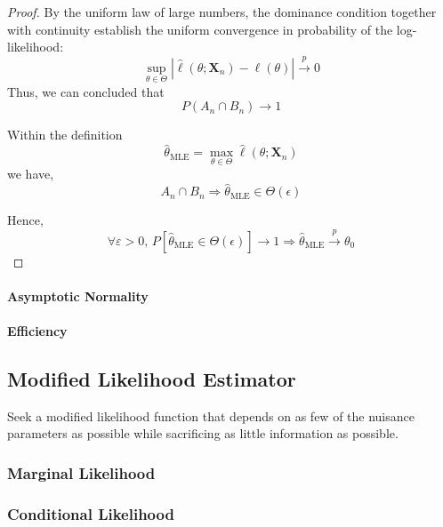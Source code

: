 \begin{proof}
	By the uniform law of large numbers, the dominance condition together with continuity establish the uniform convergence in probability of the log-likelihood:
	\begin{equation}
		\sup_{\theta\in\Theta}|\hat{\ell}(\theta;\mathbf{X}_{n})-\ell(\theta)|\stackrel{p}{\rightarrow}0
	\end{equation}
	Thus, we can concluded that
	\begin{equation}
		P\left(A_{n}\cap B_{n}\right)\rightarrow 1
	\end{equation}

	Within the definition
	\begin{equation}
		\hat{\theta}_{\text{MLE}}=\max_{\theta\in\Theta}\hat{\ell}\left(\theta;\mathbf{X}_{n}\right)
	\end{equation}
	we have,
	\begin{equation*}
		A_{n}\cap B_{n}\Longrightarrow\hat{\theta}_{\text{MLE}}\in\Theta(\epsilon)
	\end{equation*}

	Hence,
	\begin{equation*}
		\forall\varepsilon>0,\,P\left[\hat{\theta}_{\text{MLE}}\in\Theta(\epsilon)\right]\rightarrow 1\Longrightarrow\hat{\theta}_{\text{MLE}}\stackrel{p}{\rightarrow}\theta_{0}
	\end{equation*}
\end{proof}

\paragraph{Asymptotic Normality}

\paragraph{Efficiency}

\subsection{Modified Likelihood Estimator}

Seek a modified likelihood function that depends on as few of the nuisance parameters as possible while sacrificing as little information as possible.

\subsubsection{Marginal Likelihood}

\subsubsection{Conditional Likelihood}

